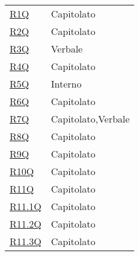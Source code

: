 \begin{center}
\begin{longtable}[!h]{p{50px} p{50px}}
        \hyperref[tab:RequisitiQualita]{R1Q}       & Capitolato                                     \\
        \hyperref[tab:RequisitiQualita]{R2Q}       & Capitolato                                     \\
        \hyperref[tab:RequisitiQualita]{R3Q}       & Verbale                                        \\
        \hyperref[tab:RequisitiQualita]{R4Q}       & Capitolato                                     \\
        \hyperref[tab:RequisitiQualita]{R5Q}       & Interno                                        \\
        \hyperref[tab:RequisitiQualita]{R6Q}       & Capitolato                                     \\
        \hyperref[tab:RequisitiQualita]{R7Q}       & Capitolato,\newline Verbale                    \\
        \hyperref[tab:RequisitiQualita]{R8Q}       & Capitolato                                     \\
        \hyperref[tab:RequisitiQualita]{R9Q}       & Capitolato                                     \\
        \hyperref[tab:RequisitiVincolo]{R10Q}      & Capitolato                                     \\
        \hyperref[tab:RequisitiVincolo]{R11Q}      & Capitolato                                     \\
        \hyperref[tab:RequisitiVincolo]{R11.1Q}    & Capitolato                                     \\
        \hyperref[tab:RequisitiVincolo]{R11.2Q}    & Capitolato                                     \\
        \hyperref[tab:RequisitiVincolo]{R11.3Q}    & Capitolato                                     \\



\end{longtable}
\end{center}
